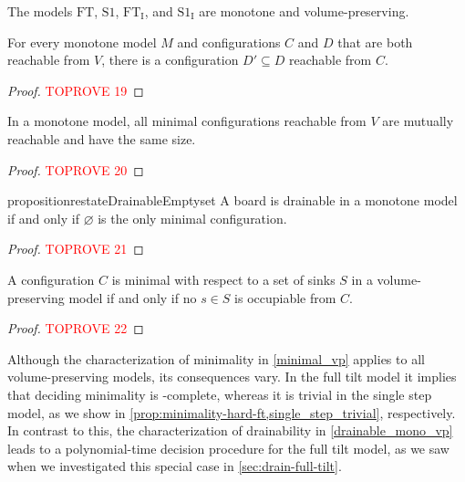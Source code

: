 \documentclass[a4paper,UKenglish,cleveref,thm-restate]{lipics-v2021}
\newcommand{\FT}{\ensuremath{\mathrm{FT}}\xspace}
\newcommand{\SSt}{\ensuremath{\mathrm{S1}}\xspace}
\newcommand{\IE}[1][\FT]{\ensuremath{{#1}_\mathrm{I}}\xspace}
\begin{document}
\begin{observation}\label{obs:concrete-properties}
The models \FT, \SSt, \IE, and \IE[\SSt] are monotone and volume-preserving.
\end{observation}

\begin{lemma}
    \label{lem:mono-confluence}
    For every monotone model $M$ and configurations $C$ and $D$ that are both
    reachable from $V$, there is a configuration $D' \subseteq D$ reachable from
    $C$.
\end{lemma}
\begin{proof}\textcolor{red}{TOPROVE 19}\end{proof}

\begin{proposition}
    \label{mono_mutual_size}
    In a monotone model, all minimal configurations reachable from $V$ are mutually
    reachable and have the same size.
\end{proposition}
\begin{proof}\textcolor{red}{TOPROVE 20}\end{proof}

\begin{restatable}{proposition}{restateDrainableEmptyset}\label{drainable_emptyset}
A board is drainable in a monotone model if and only if $\varnothing$ is the
only minimal configuration.
\end{restatable}
\begin{proof}\textcolor{red}{TOPROVE 21}\end{proof}

\begin{lemma}\label{minimal_vp}
A configuration $C$ is minimal with respect to a set of sinks $S$ in a
volume-preserving model if and only if no $s \in S$ is occupiable from $C$.
\end{lemma}
\begin{proof}\textcolor{red}{TOPROVE 22}\end{proof}

Although the characterization of minimality in \cref{minimal_vp} applies to all
volume-preserving models, its consequences vary. In the full tilt model it
implies that deciding minimality is \PSPACE-complete, whereas it is trivial in
the single step model, as we show in
\cref{prop:minimality-hard-ft,single_step_trivial}, respectively. In contrast to
this, the characterization of drainability in \cref{drainable_mono_vp} leads to a
polynomial-time decision procedure for the full tilt model, as we saw when
we investigated this special case in \cref{sec:drain-full-tilt}.
\end{document}
